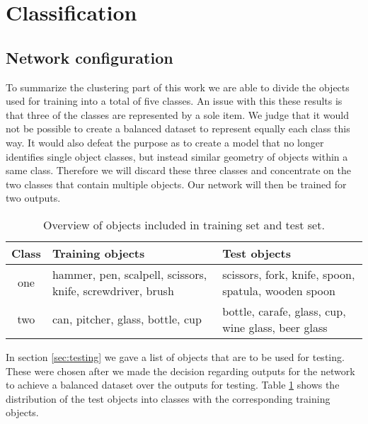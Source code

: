 %

\section{Classification}

\subsection{Network configuration}
\label{sec:res_setup}

To summarize the clustering part of this work we are able to divide the objects used for training into a total of five classes. An issue with this these results is that three of the classes are represented by a sole item. We judge that it would not be possible to create a balanced dataset to represent equally each class this way. It would also defeat the purpose as to create a model that no longer identifies single object classes, but instead similar geometry of objects within a same class. Therefore we will discard these three classes and concentrate on the two classes that contain multiple objects. Our network will then be trained for two outputs.

\begin{table}
	\begin{tabular}{|c|p{5cm}|p{5cm}|}
		\hline
		Class & Training objects & Test objects \\
		\hline
		one & hammer, pen, scalpell, scissors, knife, screwdriver, brush & scissors, fork, knife, spoon, spatula, wooden spoon \\
		\hline
		two & can, pitcher, glass, bottle, cup & bottle, carafe, glass, cup, wine glass, beer glass \\
		\hline
	\end{tabular}
	\caption{Overview of objects included in training set and test set.}
	\label{tab:classification_objects}
\end{table}

In section \ref{sec:testing} we gave a list of objects that are to be used for testing. These were chosen after we made the decision regarding outputs for the network to achieve a balanced dataset over the outputs for testing. Table \ref{tab:classification_objects} shows the distribution of the test objects into classes with the corresponding training objects.


